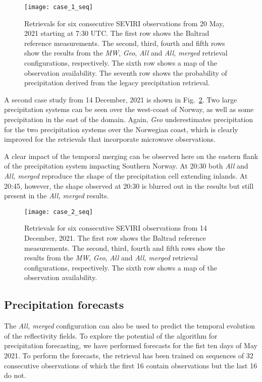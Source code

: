 \documentclass[11pt]{scrartcl}
\begin{document}
\begin{figure}
  \centering
  \texttt{[image: case\_1\_seq]}
  \caption{
    Retrievals for six consecutive SEVIRI observations from 20 May, 2021
    starting at 7:30 UTC. The first row shows the Baltrad reference
    measurements. The second, third, fourth and fifth rows show the results from
    the \textit{MW}, \textit{Geo}, \textit{All} and \textit{All, merged}
    retrieval configurations, respectively. The sixth row shows a map of the
    observation availability. The seventh row shows the probability of
    precipitation derived from the legacy precipitation retrieval.
  }
  \label{fig:case_1_seq}
\end{figure}

A second case study from 14 December, 2021 is shown in Fig.~\ref{fig:case_2_seq}.
Two large precipitation systems can be seen over the west-coast of Norway, as well
as some precipitation in the east of the domain. Again, \textit{Geo} underestimates
precipitation for the two precipitation systems over the Norwegian coast, which is
clearly improved for the retrievals that incorporate microwave observations.

A clear impact of the temporal merging can be observed here on the eastern flank
of the precipitation system impacting Southern Norway. At 20:30 both
\textit{All} and \textit{All, merged} reproduce the shape of the precipitation
cell extending inlands. At 20:45, however, the shape observed at 20:30 is
blurred out in the  results but still present in the \textit{All,
  merged} results.



\begin{figure}
  \centering
  \texttt{[image: case\_2\_seq]}
  \caption{
    Retrievals for six consecutive SEVIRI observations from 14 December, 2021.
    The first row shows the Baltrad reference measurements. The second, third,
    fourth and fifth rows show the results from the \textit{MW}, \textit{Geo},
    \textit{All} and \textit{All, merged} retrieval configurations,
    respectively. The sixth row shows a map of the observation availability.
  }
  \label{fig:case_2_seq}
\end{figure}

\subsection{Precipitation forecasts}

The \textit{All, merged} configuration can also be used to predict the temporal
evolution of the reflectivity fields. To explore the potential of the algorithm
for precipitation forecasting, we have performed forecasts for the fist ten days
of May 2021. To perform the forecasts, the retrieval has been trained on
sequences of 32 consecutive observations of which the first 16 contain
observations but the last 16 do not.
\end{document}
